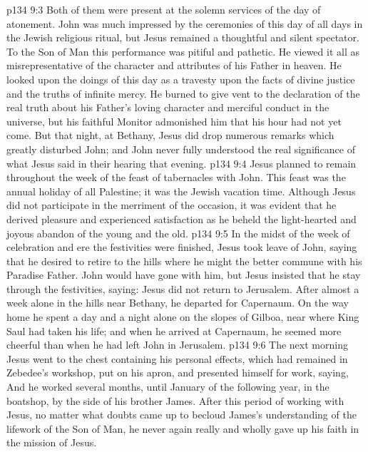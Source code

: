 \vs p134 9:3 Both of them were present at the solemn services of the day of atonement. John was much impressed by the ceremonies of this day of all days in the Jewish religious ritual, but Jesus remained a thoughtful and silent spectator. To the Son of Man this performance was pitiful and pathetic. He viewed it all as misrepresentative of the character and attributes of his Father in heaven. He looked upon the doings of this day as a travesty upon the facts of divine justice and the truths of infinite mercy. He burned to give vent to the declaration of the real truth about his Father’s loving character and merciful conduct in the universe, but his faithful Monitor admonished him that his hour had not yet come. But that night, at Bethany, Jesus did drop numerous remarks which greatly disturbed John; and John never fully understood the real significance of what Jesus said in their hearing that evening.
\vs p134 9:4 Jesus planned to remain throughout the week of the feast of tabernacles with John. This feast was the annual holiday of all Palestine; it was the Jewish vacation time. Although Jesus did not participate in the merriment of the occasion, it was evident that he derived pleasure and experienced satisfaction as he beheld the light\hyp{}hearted and joyous abandon of the young and the old.
\vs p134 9:5 In the midst of the week of celebration and ere the festivities were finished, Jesus took leave of John, saying that he desired to retire to the hills where he might the better commune with his Paradise Father. John would have gone with him, but Jesus insisted that he stay through the festivities, saying:  Jesus did not return to Jerusalem. After almost a week alone in the hills near Bethany, he departed for Capernaum. On the way home he spent a day and a night alone on the slopes of Gilboa, near where King Saul had taken his life; and when he arrived at Capernaum, he seemed more cheerful than when he had left John in Jerusalem.
\vs p134 9:6 The next morning Jesus went to the chest containing his personal effects, which had remained in Zebedee’s workshop, put on his apron, and presented himself for work, saying,  And he worked several months, until January of the following year, in the boatshop, by the side of his brother James. After this period of working with Jesus, no matter what doubts came up to becloud James’s understanding of the lifework of the Son of Man, he never again really and wholly gave up his faith in the mission of Jesus.
